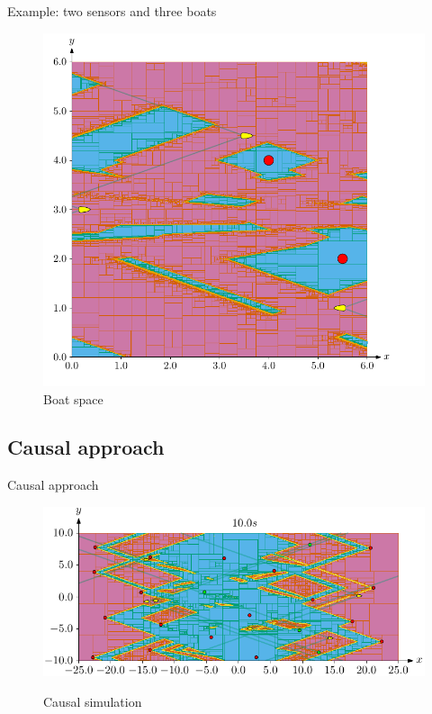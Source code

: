 \documentclass{beamer}
\begin{document}
\begin{frame}{Example: two sensors and three boats}
\begin{minipage}{0.45\textwidth}
\begin{figure}
                            \includegraphics[width=\textwidth]{imgs/ex_boat_space}
                            \caption{Boat space}
                    \end{figure}
                \end{minipage}
            \end{frame}

        \subsection{Causal approach}

            \begin{frame}{Causal approach}
                \begin{figure}
                    \centering
                    \href{run:causal.mp4?autostart}{\includegraphics[width=\textwidth]{imgs/causal_cover}}
                    \caption{Causal simulation}
                \end{figure}
            \end{frame}
\end{document}

